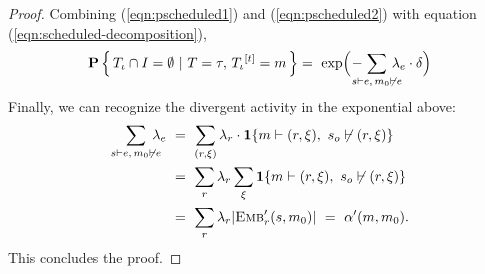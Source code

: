 \begin{proof}
  Combining (\ref{eqn:pscheduled1}) and (\ref{eqn:pscheduled2}) with
  equation (\ref{eqn:scheduled-decomposition}),
 \begin{equation*}
       \CProb{ \ATRAJ{} \cap I = \emptyset }
       { T=\tau,\,\TSTATE{t}{\ATRAJ{}} = m }
       = \ 
      \exp{ \! \Big ( \!- \hspace{-1em} \sum_{s \vdash e, \, m_0 \not\vdash
      e} \hspace{-0.9em} \lambda_e \cdot \delta \Big ) }
  \end{equation*}
  Finally, we can recognize the divergent activity in the exponential
  above:
  \vskip 0.0cm
  \begin{equation*}
    \begin{aligned}
      \sum_{s \vdash e, \, m_0 \not\vdash e} \hspace{-0.8em} \lambda_e \ 
      &= \ \sum_{(r, \xi)} \lambda_r \cdot \textbf{1}\{ m \vdash (r, \xi),\ s_o \not\vdash (r, \xi) \} \\
      &= \ \sum_r \lambda_r\sum_\xi \textbf{1}\{ m \vdash (r, \xi),\ s_o \not\vdash (r, \xi) \} \\
      &= \ \sum_r \lambda_r |\DEMBS{r}{s, m_0}|
      \ = \ \alpha'(m, m_0).
    \end{aligned}
  \end{equation*}
  \vskip 0.2cm
  \noindent This concludes the proof.
\end{proof}